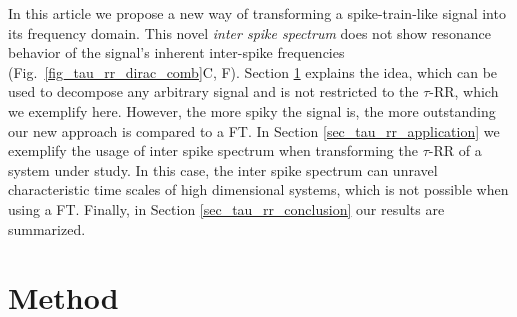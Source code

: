 \documentclass[entropy,article,submit,pdftex,moreauthors]{Definitions/mdpi}
\begin{document}
In this article we propose a new way of transforming a spike-train-like signal into its frequency domain. This novel \textit{inter spike spectrum} does not show resonance 
behavior of the signal's inherent inter-spike frequencies (Fig.~\ref{fig_tau_rr_dirac_comb}C, F). Section \ref{sec_tau_rr_method} explains the idea, which can be used to decompose 
any arbitrary signal and is not restricted to the $\tau$-RR, which we exemplify here. However, the more spiky the signal is, the more outstanding our new approach is compared to a 
FT. In Section \ref{sec_tau_rr_application} we exemplify the usage of inter spike spectrum when transforming the $\tau$-RR of a system under study. In this case, the inter spike spectrum 
can unravel characteristic time scales of high dimensional systems, which is not possible when using a FT. Finally, in Section \ref{sec_tau_rr_conclusion} our results are summarized.


\section{Method}\label{sec_tau_rr_method}
    
\end{document}
